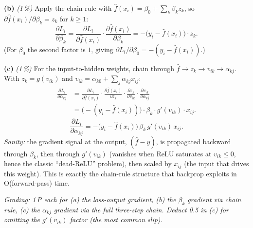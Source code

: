 \documentclass[11pt,a4paper]{article}
\newcommand{\subpoints}[1]{\textit{(#1\,\%)}}
\begin{document}
\textbf{(b)} \subpoints{1} Apply the chain rule with $\hat f(x_i) = \beta_0 + \sum_k \beta_k z_k$,
so $\partial\hat f(x_i)/\partial \beta_k = z_k$ for $k\ge 1$:
$$\boxed{\frac{\partial L_i}{\partial \beta_k}
   = \frac{\partial L_i}{\partial \hat f(x_i)}\cdot\frac{\partial \hat f(x_i)}{\partial \beta_k}
   = -\bigl(y_i - \hat f(x_i)\bigr)\cdot z_k.}$$
(For $\beta_0$ the second factor is $1$, giving $\partial L_i/\partial \beta_0 = -(y_i - \hat f(x_i))$.)

\textbf{(c)} \subpoints{1} For the input-to-hidden weights, chain through $\hat f \to z_k \to v_{ik} \to \alpha_{kj}$.
With $z_k = g(v_{ik})$ and $v_{ik} = \alpha_{k0} + \sum_j \alpha_{kj} x_{ij}$:
\begin{align*}
\frac{\partial L_i}{\partial \alpha_{kj}}
   &= \frac{\partial L_i}{\partial \hat f(x_i)}\cdot\frac{\partial \hat f(x_i)}{\partial z_k}\cdot
        \frac{\partial z_k}{\partial v_{ik}}\cdot\frac{\partial v_{ik}}{\partial \alpha_{kj}} \\
   &= \bigl(-\!(y_i - \hat f(x_i))\bigr) \cdot \beta_k \cdot g'(v_{ik}) \cdot x_{ij}.
\end{align*}
$$\boxed{\frac{\partial L_i}{\partial \alpha_{kj}} = -\bigl(y_i - \hat f(x_i)\bigr)\,\beta_k\,g'(v_{ik})\,x_{ij}.}$$
\emph{Sanity:} the gradient signal at the output, $(\hat f - y)$, is propagated backward through
$\beta_k$, then through $g'(v_{ik})$ (vanishes when ReLU saturates at $v_{ik}\le 0$, hence the
classic ``dead-ReLU'' problem), then scaled by $x_{ij}$ (the input that drives this weight). This
is exactly the chain-rule structure that backprop exploits in O(forward-pass) time.

\noindent\emph{Grading: 1\,P each for (a) the loss-output gradient, (b) the $\beta_k$ gradient via
chain rule, (c) the $\alpha_{kj}$ gradient via the full three-step chain. Deduct 0.5 in (c) for
omitting the $g'(v_{ik})$ factor (the most common slip).}
\end{document}
